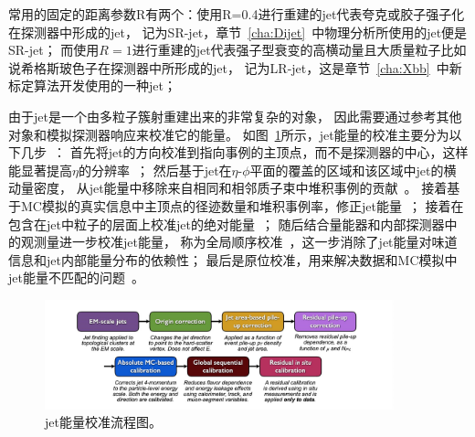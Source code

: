 常用的固定的距离参数R有两个：使用R=0.4进行重建的jet代表夸克或胶子强子化在探测器中形成的jet，
记为SR-jet，章节~\ref{cha:Dijet}~中物理分析所使用的jet便是SR-jet；
而使用$R=1$进行重建的jet代表强子型衰变的高横动量且大质量粒子比如说希格斯玻色子在探测器中所形成的jet，
记为LR-jet，这是章节~\ref{cha:Xbb}~中新标定算法开发使用的一种jet；




由于jet是一个由多粒子簇射重建出来的非常复杂的对象，
因此需要通过参考其他对象和模拟探测器响应来校准它的能量。
如图~\ref{fig:ATLASJET3}所示，jet能量的校准主要分为以下几步~\cite{JES1}：
首先将jet的方向校准到指向事例的主顶点，而不是探测器的中心，这样能显著提高$\eta$的分辨率~\cite{JES2}；
然后基于jet在$\eta$-$\phi$平面的覆盖的区域和该区域中jet的横动量密度，
从jet能量中移除来自相同和相邻质子束中堆积事例的贡献~\cite{JES3}。
接着基于MC模拟的真实信息中主顶点的径迹数量和堆积事例率，修正jet能量~\cite{JES4}；
接着在包含在jet中粒子的层面上校准jet的绝对能量~\cite{JES2}；
随后结合量能器和内部探测器中的观测量进一步校准jet能量，
称为全局顺序校准~\cite{JES5}，这一步消除了jet能量对味道信息和jet内部能量分布的依赖性；
最后是原位校准，用来解决数据和MC模拟中jet能量不匹配的问题~\cite{JES1}。

\begin{figure}
  \begin{center}
    \includegraphics[width=0.9\textwidth]{figuresEXP/ATLASJET3.jpg}
  \end{center}
  \caption{jet能量校准流程图。 }
    \label{fig:ATLASJET3}
\end{figure}



